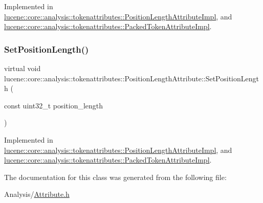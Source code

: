 Implemented in \mbox{\hyperlink{classlucene_1_1core_1_1analysis_1_1tokenattributes_1_1PositionLengthAttributeImpl_a79dfa19c547152a263d601dfaf62fe9b}{lucene\+::core\+::analysis\+::tokenattributes\+::\+Position\+Length\+Attribute\+Impl}}, and \mbox{\hyperlink{classlucene_1_1core_1_1analysis_1_1tokenattributes_1_1PackedTokenAttributeImpl_a4b5a93a1d9b61cf1504b382d24c1e6d9}{lucene\+::core\+::analysis\+::tokenattributes\+::\+Packed\+Token\+Attribute\+Impl}}.

\mbox{\label{classlucene_1_1core_1_1analysis_1_1tokenattributes_1_1PositionLengthAttribute_a514415965bae0dd392cbb8d65ea4d808}} 
\subsubsection{\texorpdfstring{Set\+Position\+Length()}{SetPositionLength()}}
{\footnotesize\ttfamily virtual void lucene\+::core\+::analysis\+::tokenattributes\+::\+Position\+Length\+Attribute\+::\+Set\+Position\+Length (\begin{DoxyParamCaption}\item[{const uint32\+\_\+t}]{position\+\_\+length }\end{DoxyParamCaption})\hspace{0.3cm}{\ttfamily [pure virtual]}}



Implemented in \mbox{\hyperlink{classlucene_1_1core_1_1analysis_1_1tokenattributes_1_1PositionLengthAttributeImpl_a8b09235c697cf5157ca4351653fcbaf4}{lucene\+::core\+::analysis\+::tokenattributes\+::\+Position\+Length\+Attribute\+Impl}}, and \mbox{\hyperlink{classlucene_1_1core_1_1analysis_1_1tokenattributes_1_1PackedTokenAttributeImpl_a3d721b90985cf600d2d44bb5f156d05d}{lucene\+::core\+::analysis\+::tokenattributes\+::\+Packed\+Token\+Attribute\+Impl}}.



The documentation for this class was generated from the following file\+:\begin{DoxyCompactItemize}
\item 
Analysis/\mbox{\hyperlink{Analysis_2Attribute_8h}{Attribute.\+h}}\end{DoxyCompactItemize}
